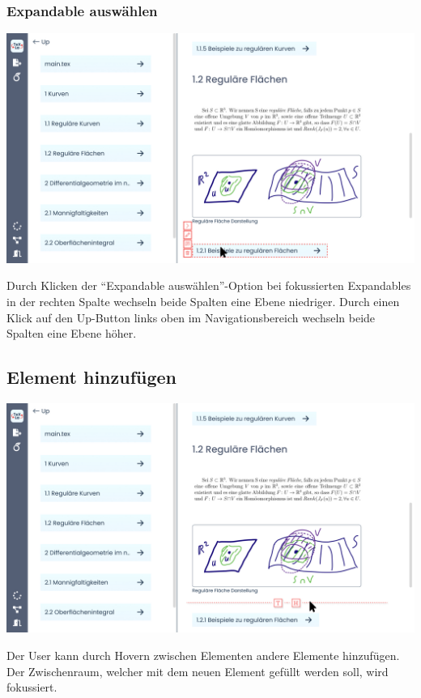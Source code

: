 \subsubsection{Expandable auswählen}
\begin{minipage}
{\linewidth}

\includegraphics[width=\textwidth]{assets/img/Select_Expandable}

\end{minipage}
Durch Klicken der \enquote{Expandable auswählen}-Option bei fokussierten Expandables in der rechten Spalte wechseln
beide Spalten eine Ebene niedriger.
Durch einen Klick auf den Up-Button links oben im Navigationsbereich wechseln beide Spalten eine Ebene höher.

\subsection{Element hinzufügen}
\label{subsec:element-hinzufuegen}
\begin{minipage}
{\linewidth}

\includegraphics[width=\textwidth]{assets/img/Item_Add_Hover}

\end{minipage}
Der User kann durch Hovern zwischen Elementen andere Elemente hinzufügen.
Der Zwischenraum, welcher mit dem neuen Element gefüllt werden soll, wird fokussiert.

